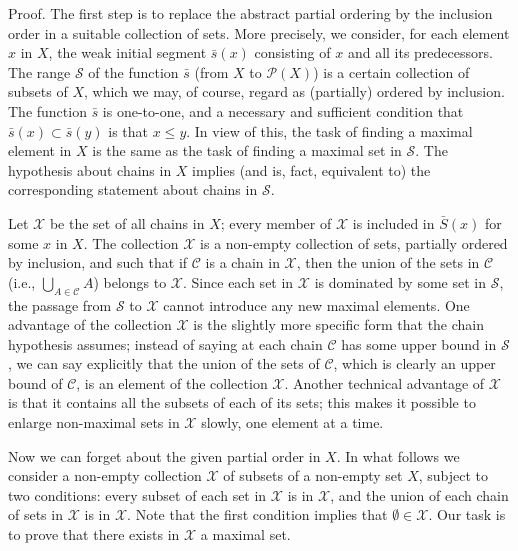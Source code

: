 Proof. The first step is to replace the abstract partial ordering by the inclusion order in a suitable collection of sets. More precisely, we consider, for each element $x$ in $X$, the weak initial segment $\bar{s}(x)$ consisting of $x$ and all its predecessors. The range $\mathcal{S}$ of the function $\bar{s}$ (from $X$ to $\mathcal{P}(X)$) is a certain collection of subsets of $X$, which we may, of course, regard as (partially) ordered by inclusion. The function $\bar{s}$ is one-to-one, and a necessary and sufficient condition that $\bar{s}(x) \subset \bar{s}(y)$ is that $x \le y$. In view of this, the task of finding a maximal element in $X$ is the same as the task of finding a maximal set in $\mathcal{S}$. The hypothesis about chains in $X$ implies (and is, fact, equivalent to) the corresponding statement about chains in $\mathcal{S}$. 

Let $\mathcal{X}$ be the set of all chains in $X$; every member of $\mathcal{X}$ is included in $\bar{S}(x)$ for some $x$ in $X$. The collection $\mathcal{X}$ is a non-empty collection of sets, partially ordered by inclusion, and such that if $\mathcal{C}$ is a chain in $\mathcal{X}$, then the union of the sets in $\mathcal{C}$ (i.e., $\bigcup_{A \in \mathcal{C}} A$) belongs to $\mathcal{X}$. Since each set in $\mathcal{X}$ is dominated by some set in $\mathcal{S}$, the passage from $\mathcal{S}$ to $\mathcal{X}$ cannot introduce any new maximal elements. One advantage of the collection $\mathcal{X}$ is the slightly more specific form that the chain hypothesis assumes; instead of saying at each chain $\mathcal{C}$ has some upper bound in $\mathcal{S}$, we can say explicitly that the union of the sets of $\mathcal{C}$, which is clearly an upper bound of $\mathcal{C}$, is an element of the collection $\mathcal{X}$. Another technical advantage of $\mathcal{X}$ is that it contains all the subsets of each of its sets; this makes it possible to enlarge non-maximal sets in $\mathcal{X}$ slowly, one element at a time. 

Now we can forget about the given partial order in $X$. In what follows we consider a non-empty collection $\mathcal{X}$ of subsets of a non-empty set $X$, subject to two conditions: every subset of each set in $\mathcal{X}$ is in $\mathcal{X}$, and the union of each chain of sets in $\mathcal{X}$ is in $\mathcal{X}$. Note that the first condition implies that $\emptyset \in \mathcal{X}$. Our task is to prove that there exists in $\mathcal{X}$ a maximal set. 

